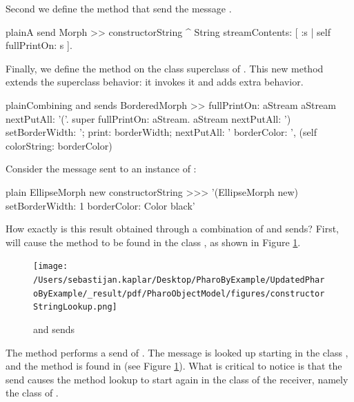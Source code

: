 \documentclass[10pt,twoside,english]{_support/latex/sbabook/sbabook}
\begin{document}
Second we define the method  that send the message .

\begin{listing}[float, label=scr:constructorString]{plain}{A  send}
Morph >> constructorString
    ^ String streamContents: [ :s | self fullPrintOn: s  ].
\end{listing}

Finally, we define the method  on the class 
superclass of . This new method extends the superclass behavior:
it invokes it and adds extra behavior.

\begin{listing}[float, label=scr:fullPrintOn]{plain}{Combining  and  sends}
BorderedMorph >> fullPrintOn: aStream
    aStream nextPutAll: '('.
    super fullPrintOn: aStream.
    aStream
        nextPutAll: ') setBorderWidth: ';
        print: borderWidth;
        nextPutAll: ' borderColor: ', (self colorString: borderColor)
\end{listing}

Consider the message  sent to an instance of :

\begin{displaycode}{plain}
EllipseMorph new constructorString
>>> '(EllipseMorph new) setBorderWidth: 1 borderColor: Color black'
\end{displaycode}

How exactly is this result obtained through a combination of  and
 sends? First,  will cause the method
 to be found in the class , as shown in Figure
\ref{fig:constructorStringLookup}.


\begin{figure}

\begin{center}
\texttt{[image: /Users/sebastijan.kaplar/Desktop/PharoByExample/UpdatedPharoByExample/\_result/pdf/PharoObjectModel/figures/constructorStringLookup.png]}\caption{ and  sends\label{fig:constructorStringLookup}}\end{center}
\end{figure}


The method  performs a  send of
. The message  is looked up starting in the
class , and the method  is found
in  (see Figure \ref{fig:constructorStringLookup}). What is
critical to notice is that the  send causes the method lookup to start
again in the class of the receiver, namely the class of .
\end{document}
